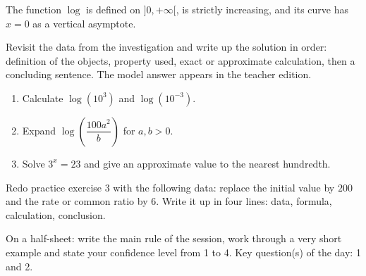 \begin{traceecrite}The function $\log$ is defined on $]0,+\infty[$, is strictly increasing, and its curve has $x=0$ as a vertical asymptote.\end{traceecrite}

\begin{exemple}
Revisit the data from the investigation and write up the solution in order: definition of the objects, property used, exact or approximate calculation, then a concluding sentence. The model answer appears in the teacher edition.
\end{exemple}
\enseignant{The logarithm is the inverse function of $10^x$: domain $]0,+\infty[$, strictly increasing, asymptote $x=0$.}

\begin{exercice}[-- essential]
\begin{enumerate}\item Calculate $\log(10^3)$ and $\log(10^{-3})$.\item Expand $\log\!\left(\dfrac{100a^2}{b}\right)$ for $a,b>0$.\item Solve $3^x=23$ and give an approximate value to the nearest hundredth.\end{enumerate}
\end{exercice}


\begin{dm}Redo practice exercise 3 with the following data: replace the initial value by $200$ and the rate or common ratio by $6$. Write it up in four lines: data, formula, calculation, conclusion.\end{dm}

\begin{sortie}On a half-sheet: write the main rule of the session, work through a very short example and state your confidence level from 1 to 4. Key question(s) of the day: 1 and 2.\end{sortie}

